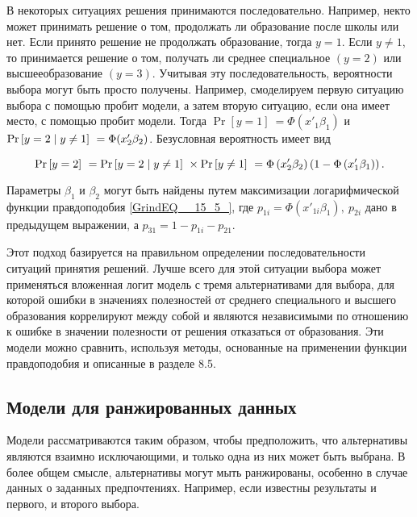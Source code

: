 В некоторых ситуациях решения принимаются  последовательно. Например, некто может принимать решение о том, продолжать ли образование после школы или нет. Если принято решение не продолжать образование, тогда $y=1$. Если $y\ne 1$, то принимается решение о том, получать ли среднее специальное $\left(y=2\right)$ или высшееобразование $\left(y=3\right)$. Учитывая эту последовательность, вероятности выбора могут быть просто получены. Например, смоделируем первую ситуацию выбора с помощью пробит модели, а затем вторую ситуацию, если она имеет место, с помощью пробит модели. Тогда ${\Pr  \left[y=1\right]\ }=\Phi (x'_1{\beta }_1)$ и ${\Pr  \left[y=2\mathrel{\left|\vphantom{y=2 y\ne 1}\right.\kern-\nulldelimiterspace}y\ne 1\right]\ }=\Phi (x'_2{\beta }_2)$. Безусловная вероятность имеет вид

\[{\Pr  \left[y=2\right]\ }={\Pr  \left[y=2\mathrel{\left|\vphantom{y=2 y\ne 1}\right.\kern-\nulldelimiterspace}y\ne 1\right]\ }\times {\Pr  \left[y\ne 1\right]\ }=\Phi \left(x'_2{\beta }_2\right)\left(1-\Phi \left(x'_1{\beta }_1\right)\right).\] 

Параметры ${\beta }_1$ и ${\beta }_2$ могут быть найдены путем максимизации логарифмической функции правдоподобия \eqref{GrindEQ__15_5_}, где $p_{1i}=\Phi \left(x'_{1i}{\beta }_1\right),\ p_{2i}$ дано в предыдущем выражении, а $p_{31}=1-p_{1i}-p_{21}$.

Этот подход базируется на правильном определении последовательности ситуаций принятия решений. Лучше всего для этой ситуации выбора может применяться вложенная логит модель с тремя альтернативами для выбора, для которой ошибки в значениях полезностей от среднего специального и высшего образования коррелируют между собой и являются независимыми по отношению к ошибке в значении полезности от решения отказаться от образования. Эти модели можно сравнить, используя методы, основанные на применении функции правдоподобия и описанные в разделе 8.5. 

\subsection{Модели для ранжированных данных}

Модели рассматриваются таким образом, чтобы предположить, что альтернативы являются взаимно исключающими, и только одна из них может быть выбрана. В более общем смысле, альтернативы могут мыть ранжированы, особенно в случае данных о заданных предпочтениях. Например, если известны результаты и первого, и второго выбора. 


